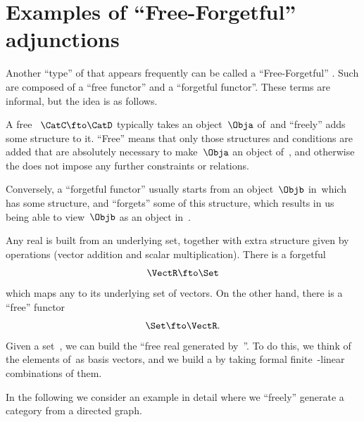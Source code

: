 
\section[Free-forgetful adjunction]{Examples of ``Free-Forgetful'' adjunctions}
\label{sec:free-forgetful-adjunction-graph-example}

Another ``type'' of  that appears frequently can be called a ``Free-Forgetful'' .
Such  are composed of a ``free functor'' and a ``forgetful functor''.
These terms are informal, but the idea is as follows.

A free ~$\CatC \fto \CatD$ typically takes an object~$\Obja$ of~\CatC and ``freely'' adds some structure to it.
``Free'' means that only those structures and conditions are added that are absolutely necessary to make~$\Obja$ an object of~\CatD, and otherwise the  does not impose any further constraints or relations.

Conversely, a ``forgetful functor'' usually starts from an object~$\Objb$ in~\CatD which has some structure, and ``forgets'' some of this structure, which results in us being able to view~$\Objb$ as an object in~\CatC.

\begin{example}
    Any real  is built from an underlying set, together with extra structure given by operations (vector addition and scalar multiplication).
    There is a forgetful 
    \begin{equation}\label{eq:forgetful-functor-from-VectR}
        \VectR \fto \Set
    \end{equation}
    which maps any  to its underlying set of vectors.
    On the other hand, there is a ``free'' functor
    \begin{equation}\label{eq:free-functor-to-VectR}
        \Set \fto \VectR.
    \end{equation}
    Given a set~\setA, we can build the ``free real  generated by~\setA''.
    To do this, we think of the elements of~\setA as basis vectors, and we build a  by taking formal finite~\reals-linear combinations of them.
\end{example}

In the following we consider an example in detail where we ``freely'' generate a category from a directed graph.

